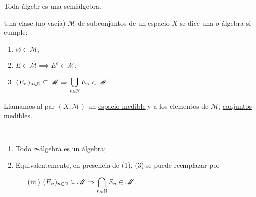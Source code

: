 \documentclass[a4paper]{report}
\begin{document}
	\begin{note}
		Toda álgebr es una semiálgebra.
	\end{note}

	\begin{definition}
		Una clase (no vacía) $\mathscr{M}$ de subconjuntos de un espacio $X$ se dice una $\sigma$-álgebra si cumple:
		\begin{enumerate}
			\item $\varnothing \in \mathscr{M}$;

			\item $E \in \mathscr{M} \implies E^c \in \mathscr{M}$;

			\item $(E_n)_{n\in\mathbb{N}} \subseteq \mathscr{M} \Rightarrow \displaystyle\bigcup_{n\in\mathbb{N}} E_n \in \mathscr{M}$.
		\end{enumerate}
		\noindent Llamamos al par $(X,\mathscr{M})$ un \underline{espacio medible} y a los elementos de $\mathscr{M}$, \underline{conjuntos medibles}.
	\end{definition}

	\begin{note}~
		\begin{enumerate}
			\item Todo $\sigma$-álgebra es un álgebra;

			\item Equivalentemente, en presencia de (1), (3) se puede reemplazar por
			\begin{enumerate}
				\item[(iii')] $(E_n)_{n\in\mathbb{N}} \subseteq \mathscr{M} \Rightarrow \displaystyle\bigcap_{n\in\mathbb{N}} E_n \in \mathscr{M}$.
			\end{enumerate}
		\end{enumerate}
	\end{note}
\end{document}

